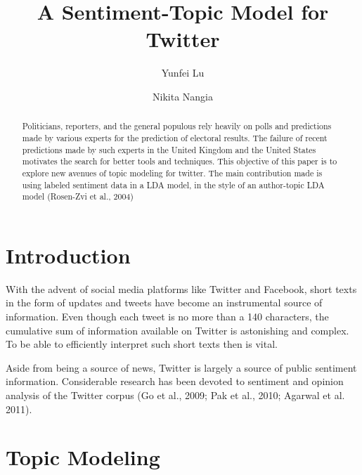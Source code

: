 \documentclass[12pt]{amsart}
\title[author-LDA with sentiment]
{A Sentiment-Topic Model for Twitter}
\author{Yunfei Lu}
\author{Nikita Nangia}
\newcommand{\0}{\mat{0}}
\newcommand{\1}{\mathds{1}}
\begin{document}
\begin{abstract}
  Politicians, reporters, and the general populous rely heavily on polls and predictions made by various experts for the prediction of electoral results. The failure of recent predictions made by such experts in the United Kingdom and the United States motivates the search for better tools and techniques. This objective of this paper is to explore new avenues of topic modeling for twitter. The main contribution made is using labeled sentiment data in a LDA model, in the style of an author-topic LDA model (Rosen-Zvi et al., 2004)

\end{abstract}

\maketitle

\section{Introduction}
With the advent of social media platforms like Twitter and Facebook, short texts in the form of updates and tweets have become an instrumental source of information. Even though each tweet is no more than a 140 characters, the cumulative sum of information available on Twitter is astonishing and complex. To be able to efficiently interpret such short texts then is vital. 

Aside from being a source of news, Twitter is largely a source of public sentiment information. Considerable research has been devoted to sentiment and opinion analysis of the Twitter corpus (Go et al., 2009; Pak et al., 2010; Agarwal et al. 2011). 


\section{Topic Modeling}
\end{document}
